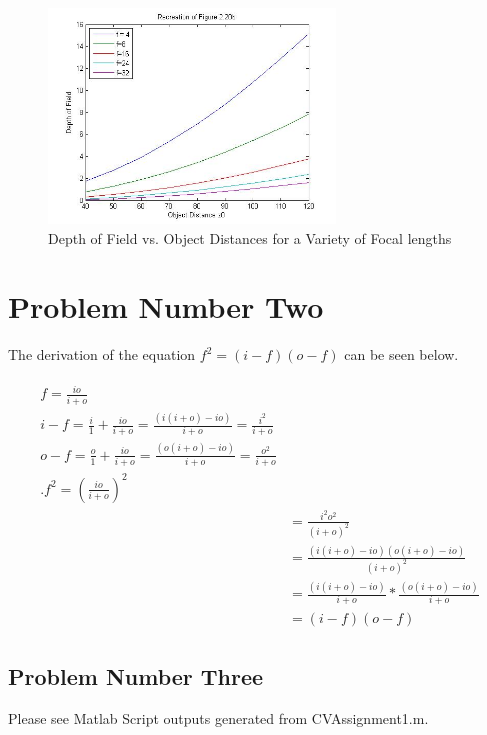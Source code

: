 \documentclass[paper=a4, fontsize=11pt]{scrartcl} %
\numberwithin{equation}{section} %
\numberwithin{figure}{section} %
\numberwithin{table}{section} %
\begin{document}
\begin{figure}
\centering
\includegraphics[width=3in]{prob13.jpg}
\caption{Depth of Field vs. Object Distances for a Variety of Focal lengths}
\label{Part 3}
\end{figure} 


\section{Problem Number Two}

The derivation of the equation \begin{math}f^{2}=(i-f)(o-f)\end{math} can be seen below.

\begin{align} 
\begin{split}
f = \frac{io}{i+o}\\	
i-f = \frac{i}{1}+\frac{io}{i+o} = \frac{(i(i+o)-io)}{i+o} = \frac{i^{2}}{i+o}\\	
o-f =\frac{o}{1}+\frac{io}{i+o} = \frac{(o(i+o)-io)}{i+o} = \frac{o^2}{i+o}\\.
f^{2}=(\frac{io}{i+o})^{2}\\
&=\frac{i^{2}o^{2}}{(i+o)^{2}}\\
&=\frac{(i(i+o) -io)(o(i+o)-io)}{(i+o)^2}\\
&= \frac{(i(i+o)-io)}{i+o}* \frac{(o(i+o)-io)}{i+o}\\
&=(i-f)(o-f)
\end{split}					
\end{align}


\subsection{Problem Number Three}

Please see Matlab Script outputs generated from CVAssignment1.m.
\end{document}
